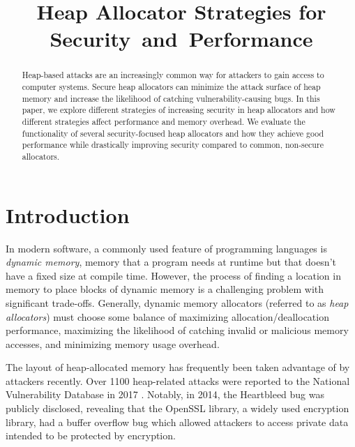 \documentclass[conference]{IEEEtran}
\begin{document}
\title{Heap Allocator Strategies for Security~and~Performance}

\author{
}

\maketitle

\begin{abstract}
	Heap-based attacks are an increasingly common way for attackers to gain access to computer systems.
	Secure heap allocators can minimize the attack surface of heap memory and increase the likelihood of catching vulnerability-causing bugs.
	In this paper, we explore different strategies of increasing security in heap allocators and how different strategies affect performance and memory overhead.
	We evaluate the functionality of several security-focused heap allocators and how they achieve good performance while drastically improving security compared to common, non-secure allocators.
\end{abstract}

\section{Introduction}
In modern software, a commonly used feature of programming languages is \emph{dynamic memory}, memory that a program needs at runtime but that doesn't have a fixed size at compile time.
However, the process of finding a location in memory to place blocks of dynamic memory is a challenging problem with significant trade-offs.
Generally, dynamic memory allocators (referred to as \emph{heap allocators}) must choose some balance of maximizing allocation/deallocation performance, maximizing the likelihood of catching invalid or malicious memory accesses, and minimizing memory usage overhead.

The layout of heap-allocated memory has frequently been taken advantage of by attackers recently.
Over 1100 heap-related attacks were reported to the National Vulnerability Database in 2017 \cite{guarder}.
Notably, in 2014, the Heartbleed bug was publicly disclosed, revealing that the OpenSSL library, a widely used encryption library, had a buffer overflow bug which allowed attackers to access private data intended to be protected by encryption.
\end{document}
